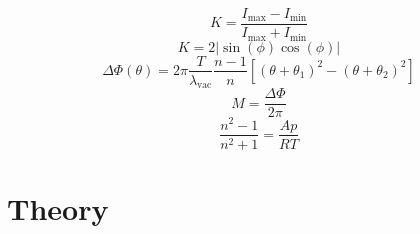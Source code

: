 \begin{equation}
    K=\frac{I_\text{max}-I_\text{min}}{I_\text{max}+I_\text{min}}
    \label{eqn:contrast}
\end{equation}
\begin{equation}
    K=2|\sin(\phi)\cos(\phi)|
    \label{eqn:contrast2}
\end{equation}
\begin{equation}
    \Delta\Phi(\theta)=2\pi\frac{T}{\lambda_\text{vac}}\frac{n-1}{n}[(\theta+\theta_1)^2-(\theta+\theta_2)^2]
    \label{eqn:delta}
\end{equation}
\begin{equation}
    M=\frac{\Delta\Phi}{2\pi}
    \label{eqn:M}
\end{equation}
\begin{equation}
    \frac{n^2-1}{n^2+1}=\frac{Ap}{RT}
    \label{eqn:LLL}
\end{equation}


\section{Theory}
\label{sec:theory}
